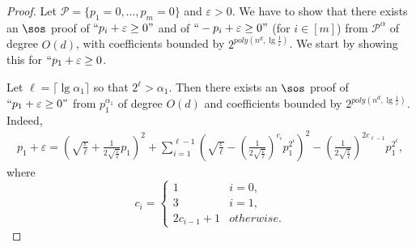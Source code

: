 \documentclass[11pt]{article}
\newtheorem{proposition}[theorem]{Proposition}
\begin{document}
\begin{proof}
    Let $\mathcal{P} = \{p_1 = 0, \dots, p_m=0\}$ and $\varepsilon > 0$. We have to show that there exists an $\sos$ proof of $``p_i + \varepsilon \geq 0"$ and of $``-p_i + \varepsilon \geq 0"$ (for $i \in [m]$) from $\mathcal{P}^{\alpha}$ of degree $O(d)$, with coefficients bounded by $2^{poly(n^d, \lg \frac{1}{\varepsilon})}$. We start by showing this for $``p_1 + \varepsilon \geq 0$.

    Let $\ell = \lceil \lg \alpha_1 \rceil$ so that $2^{\ell} > \alpha_1$. Then there exists an $\sos$ proof of $``p_1 + \varepsilon \geq 0"$ from $p_1^{\alpha_1}$ of degree $O(d)$ and coefficients bounded by $2^{poly(n^d, \lg \frac{1}{\varepsilon})}$. Indeed,
    \begin{align*}
        p_1 + \varepsilon = \left(\sqrt{\frac{\varepsilon}{\ell}} + \frac{1}{2\sqrt{\frac{\varepsilon}{\ell}}} p_1 \right)^2 + \sum_{i=1}^{\ell-1} \left( \sqrt{\frac{\varepsilon}{\ell}} - \left( \frac{1}{2 \sqrt{\frac{\varepsilon}{\ell}}} \right)^{c_i} p_1^{2^i} \right)^2 - \left( \frac{1}{2 \sqrt{\frac{\varepsilon}{\ell}}} \right)^{2c_{\ell-1}} p_1^{2^\ell},
    \end{align*}
    where
    \begin{equation*}
        c_i = 
        \begin{cases}
            1 & i = 0, \\
            3 & i = 1, \\
            2c_{i-1} + 1 & otherwise.
        \end{cases}
    \end{equation*}
\end{proof}

\end{document}
